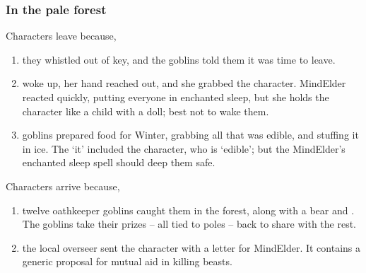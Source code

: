 \begin{multicols}{2}
{  \subsubsection{In the pale forest}

  Characters leave because,

  \begin{enumerate}
    \item
    they whistled out of key, and the goblins told them it was time to leave.
    \item
     woke up, her hand reached out, and she grabbed the character.
    \gls{MindElder} reacted quickly, putting everyone in enchanted sleep, but she holds the character like a child with a doll; best not to wake them.
    \item
    goblins prepared food for Winter, grabbing all that was edible, and stuffing it in ice.
    The `it' included the character, who is `edible'; but the \gls{MindElder}'s enchanted sleep spell should deep them safe.
  \end{enumerate}

  Characters arrive because,

  \begin{enumerate}
    \item
    twelve oathkeeper goblins caught them in the forest, along with a bear and .
    The goblins take their prizes -- all tied to poles -- back to share with the rest.
    \item
    the local overseer sent the character with a letter for \gls{MindElder}.
    It contains a generic proposal for mutual aid in killing beasts.
  \end{enumerate}

}

\end{multicols}

